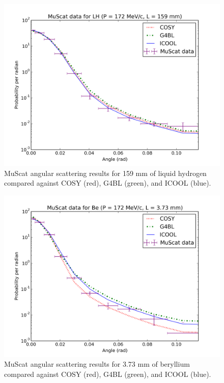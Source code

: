 \begin{figure}[H]
  \centering
    \includegraphics[width=\textwidth]{Figures/172.159.muscat} 
  \caption{MuScat angular scattering results for 159 mm of liquid hydrogen compared against COSY (red), G4BL (green), and ICOOL (blue).}
  \label{fig:172.159.muscat}
\end{figure}

\begin{figure}[H]
  \centering
    \includegraphics[width=\textwidth]{Figures/172.3.73.muscat} 
  \caption{MuScat angular scattering results for 3.73 mm of beryllium compared against COSY (red), G4BL (green), and ICOOL (blue).}
  \label{fig:172.3.73.muscat}
\end{figure}

